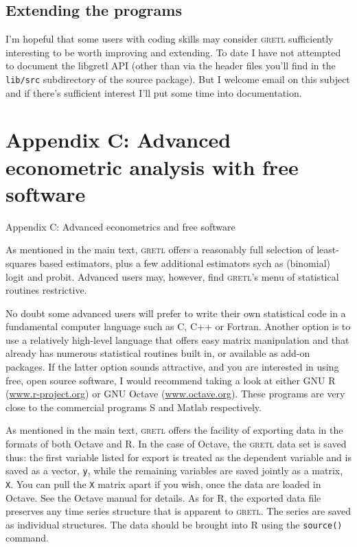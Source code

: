 \documentclass{article}
\begin{document}
\subsection{Extending the programs}

I'm hopeful that some users with coding skills may consider
\textsc{gretl} sufficiently interesting to be worth improving and
extending.  To date I have not attempted to document the libgretl API
(other than via the header files you'll find in the \texttt{lib/src}
subdirectory of the source package).  But I welcome email on this
subject and if there's sufficient interest I'll put some time into
documentation.  

\section*{Appendix C: Advanced econometric analysis with free software}
%
{Appendix C: Advanced econometrics and free software}
\label{advanced}

As mentioned in the main text, \textsc{gretl} offers a reasonably full
selection of least-squares based estimators, plus a few additional
estimators sych as (binomial) logit and probit.  Advanced users may,
however, find \textsc{gretl}'s menu of statistical routines
restrictive.  

No doubt some advanced users will prefer to write their own
statistical code in a fundamental computer language such as C, C++ or
Fortran.  Another option is to use a relatively high-level language
that offers easy matrix manipulation and that already has numerous
statistical routines built in, or available as add-on packages.  If
the latter option sounds attractive, and you are interested in using
free, open source software, I would recommend taking a look at either
GNU R (\url{www.r-project.org}) or GNU Octave (\url{www.octave.org}).
These programs are very close to the commercial programs S and Matlab
respectively.  

As mentioned in the main text, \textsc{gretl} offers the facility of
exporting data in the formats of both Octave and R.  In the case of
Octave, the \textsc{gretl} data set is saved thus: the first variable
listed for export is treated as the dependent variable and is saved as
a vector, \texttt{y}, while the remaining variables are saved jointly
as a matrix, \texttt{X}.  You can pull the \texttt{X} matrix apart if
you wish, once the data are loaded in Octave.  See the Octave manual
for details.  As for R, the exported data file preserves any time
series structure that is apparent to \textsc{gretl}.  The series are
saved as individual structures.  The data should be brought into R
using the \texttt{source()} command.
\end{document}

